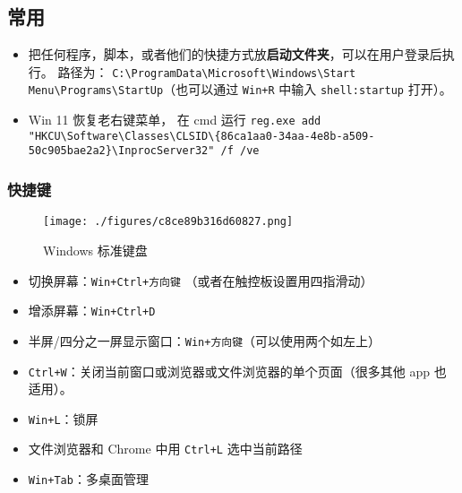 


\subsection{常用}
\begin{itemize}
\item 把任何程序，脚本，或者他们的快捷方式放\textbf{启动文件夹}，可以在用户登录后执行。 路径为： \verb|C:\ProgramData\Microsoft\Windows\Start Menu\Programs\StartUp|（也可以通过 \verb|Win+R| 中输入 \verb|shell:startup| 打开）。
\item Win 11 恢复老右键菜单， 在 cmd 运行 \verb`reg.exe add "HKCU\Software\Classes\CLSID\{86ca1aa0-34aa-4e8b-a509-50c905bae2a2}\InprocServer32" /f /ve`
\end{itemize}

\subsubsection{快捷键}
\begin{figure}[ht]
\centering
\texttt{[image: ./figures/c8ce89b316d60827.png]}
\caption{Windows 标准键盘} \label{fig_WinNt_1}
\end{figure}

\begin{itemize}
\item 切换屏幕：\verb|Win+Ctrl+方向键| （或者在触控板设置用四指滑动）
\item 增添屏幕：\verb|Win+Ctrl+D|
\item 半屏/四分之一屏显示窗口：\verb|Win+方向键|（可以使用两个如左上）
\item \verb|Ctrl+W|：关闭当前窗口或浏览器或文件浏览器的单个页面（很多其他 app 也适用）。
\item \verb|Win+L|：锁屏
\item 文件浏览器和 Chrome 中用 \verb|Ctrl+L| 选中当前路径
\item \verb|Win+Tab|：多桌面管理
\end{itemize}

